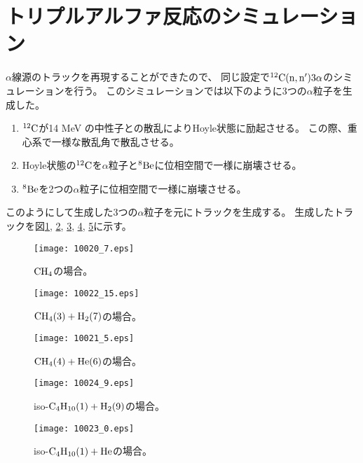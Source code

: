\documentclass[../master]{subfiles}
\begin{document}
\section{トリプルアルファ反応のシミュレーション}
$\alpha$線源のトラックを再現することができたので、
同じ設定で${}^{12}{\rm C}({\rm n},{\rm n}')3\alpha$のシミュレーションを行う。
このシミュレーションでは以下のように3つの$\alpha$粒子を生成した。
\begin{enumerate}
\item
  ${}^{12}{\rm C}$が14 MeV の中性子との散乱によりHoyle状態に励起させる。
  この際、重心系で一様な散乱角で散乱させる。
\item
  Hoyle状態の${}^{12}{\rm C}$を$\alpha$粒子と${}^{8}{\rm Be}$に位相空間で一様に崩壊させる。
\item
  ${}^{8}{\rm Be}$を2つの$\alpha$粒子に位相空間で一様に崩壊させる。
\end{enumerate}
このようにして生成した3つの$\alpha$粒子を元にトラックを生成する。
生成したトラックを図\ref{fig::three_alpha_ch4}, \ref{fig::three_alpha_ch4_h2}, \ref{fig::three_alpha_ch4_he},
\ref{fig::three_alpha_ic4h10_h2}, \ref{fig::three_alpha_ic4h10_he}に示す。
\begin{figure}
  \centering
  \texttt{[image: 10020\_7.eps]}
  \caption{$\rm CH_{4}$の場合。}
  \label{fig::three_alpha_ch4}
\end{figure}
\begin{figure}
  \centering
  \texttt{[image: 10022\_15.eps]}
  \caption{$\rm CH_{4} (3) + H_{2} (7)$の場合。}
  \label{fig::three_alpha_ch4_h2}
\end{figure}
\begin{figure}
  \centering
  \texttt{[image: 10021\_5.eps]}
  \caption{$\rm CH_{4} (4) + He (6)$の場合。}
  \label{fig::three_alpha_ch4_he}
\end{figure}
\begin{figure}
  \centering
  \texttt{[image: 10024\_9.eps]}
  \caption{iso-$\rm C_{4}H_{10} (1) + H_{2} (9)$の場合。}
  \label{fig::three_alpha_ic4h10_h2}
\end{figure}
\begin{figure}
  \centering
  \texttt{[image: 10023\_0.eps]}
  \caption{iso-$\rm C_{4}H_{10} (1) + He$の場合。}
  \label{fig::three_alpha_ic4h10_he}
\end{figure}
\end{document}
